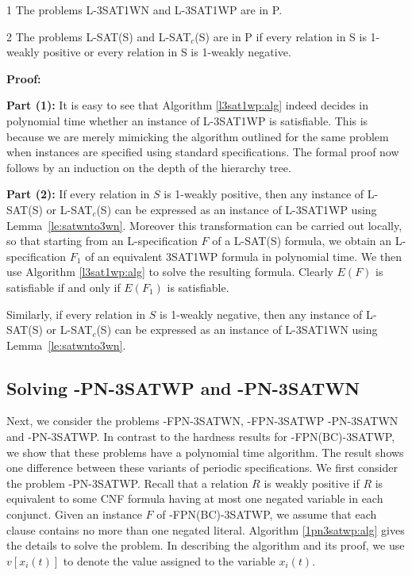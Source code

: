 \morespacing

\begin{theorem}\label{th:h3sat1wneasy}
\begin{description}
\item{1}
The problems L-3SAT1WN and L-3SAT1WP are in P. 
\item{2}
The problems L-SAT(S) and L-SAT$_c$(S) are in P if every relation in S is
1-weakly positive or every relation in S is 1-weakly negative.
\end{description}
\end{theorem}



\noindent
{\bf Proof:}

\noindent
{\bf Part (1):} 
It is easy to see that Algorithm \ref{l3sat1wp:alg} indeed decides
in polynomial time whether an instance of {\sf L-3SAT1WP} is satisfiable. This
is because we are merely mimicking the algorithm outlined for the same problem
when instances are specified using standard specifications. The formal proof
now follows by an induction on the depth of the hierarchy tree.



\noindent
{\bf Part (2):}  
If every relation in $S$ is 1-weakly positive, then any instance of 
{\sf L-SAT(S)} or {\sf L-SAT$_c$(S)} can be expressed as an instance of 
{\sf L-3SAT1WP} using 
Lemma~\ref{le:satwnto3wn}. Moreover this transformation can be carried out
locally, so that starting from an {\sf L}-specification $F$ 
of a {\sf L-SAT(S)} 
formula, we obtain an {\sf L}-specification $F_1$ of an equivalent 
{\sf 3SAT1WP} formula in polynomial time.
We then use Algorithm \ref{l3sat1wp:alg} to solve the resulting formula.
Clearly $E(F)$ is satisfiable if and only if $E(F_1)$ is satisfiable.

Similarly, if every relation in $S$ is 1-weakly negative, 
then any instance of {\sf L-SAT(S)} or {\sf L-SAT$_c$(S)} 
can be expressed as an instance of {\sf L-3SAT1WN} using 
Lemma~\ref{le:satwnto3wn}. \hfill\QED




\subsection{Solving {-PN-3SATWP} and  {-PN-3SATWN}}
Next, we consider the problems {-FPN-3SATWN}, {-FPN-3SATWP}
{-PN-3SATWN} and  {-PN-3SATWP}. In contrast to the hardness results
for {-FPN(BC)-3SATWP}, we show that
these problems have a polynomial
time algorithm. The result shows one difference between these variants
of periodic specifications. We first consider the problem {-PN-3SATWP}.
Recall that a relation $R$ is weakly positive if $R$ is equivalent to some
{\sf CNF} formula having at most one negated variable in each conjunct. 
Given an instance $F$ of {-FPN(BC)-3SATWP}, we assume that each clause
contains no more than one negated literal. Algorithm \ref{1pn3satwp:alg}
gives the details to solve the problem. In describing the algorithm and its
proof, we use $v[x_i(t)]$ to denote the value assigned to the variable 
$x_i(t)$.

